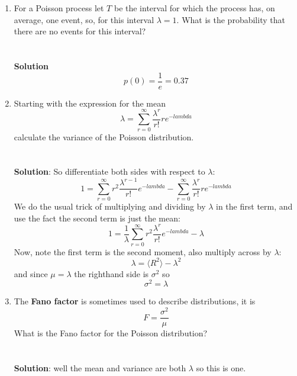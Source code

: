 \documentclass[11pt,a4paper]{scrartcl}
\begin{document}
\begin{enumerate}

\item For a Poisson process let $T$ be the interval for which the
process has, on average, one event, so, for this interval $\lambda=1$. What is the probability that there are no events for this interval?\\ \\ \\  
\textbf{Solution}
\begin{equation}
p(0)=\frac{1}{e}=0.37
\end{equation}

\item Starting with the expression for the mean
  \begin{equation}
    \lambda =\sum_{r=0}^\infty \frac{\lambda^r}{r!}re^{-lambda}
  \end{equation}
  calculate the variance of the Poisson distribution.\\ \\ \\  
  \textbf{Solution}: So differentiate both sides with respect to $\lambda$:
  \begin{equation}
    1=\sum_{r=0}^\infty r^2 \frac{\lambda^{r-1}}{r!}e^{-lambda}-\sum_{r=0}^\infty \frac{\lambda^r}{r!}re^{-lambda}
  \end{equation}
  We do the usual trick of multiplying and dividing by $\lambda$ in the first term, and use the fact the second term is just the mean:
  \begin{equation}
    1=\frac{1}{\lambda}\sum_{r=0}^\infty r^2 \frac{\lambda^r}{r!}e^{-lambda}-\lambda
  \end{equation}
  Now, note the first term is the second moment, also multiply across by $\lambda$:
  \begin{equation}
    \lambda=\langle R^2\rangle-\lambda^2
  \end{equation}
  and since $\mu=\lambda$ the righthand side is $\sigma^2$ so
  \begin{equation}
    \sigma^2=\lambda
  \end{equation}
  
  
\item The \textbf{Fano factor} is sometimes used to describe distributions, it is
  \begin{equation}
    F=\frac{\sigma^2}{\mu}
  \end{equation}
What is the Fano factor for the Poisson distribution?
\\ \\ \\  
\textbf{Solution}: well the mean and variance are both $\lambda$ so this is one.

\end{enumerate}
\end{document}
